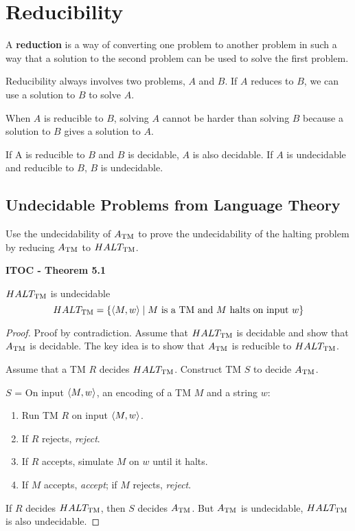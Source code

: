 \section{Reducibility}

A \textbf{reduction} is a way of converting one problem to another problem in such a way that a solution to the second problem can be used to solve the first problem.

Reducibility always involves two problems, $A$ and $B$. If $A$ reduces to $B$, we can use a solution to $B$ to solve $A$.

When $A$ is reducible to $B$, solving $A$ cannot be harder than solving $B$ because a solution to $B$ gives a solution to $A$.

{\color{blue} If A is reducible to $B$ and $B$ is decidable, $A$ is also decidable. If $A$ is undecidable and reducible to $B$, $B$ is undecidable.}

\subsection{Undecidable Problems from Language Theory}

Use the undecidability of $A_{\text{TM}}$ to prove the undecidability of the halting problem by reducing $A_{\text{TM}}$ to $HALT_{\text{TM}}$.


\label{lang:HALTTM_UDCDB}
\begin{shaded}
\textbf{ITOC - Theorem 5.1}

\medskip
$HALT_{\text{TM}}$ is undecidable
\[
HALT_{\text{TM}} = \{\langle{M, w}\rangle \mid \text{$M$ is a TM and $M$ halts on input $w$}\}
\]
\end{shaded}

\begin{mdframed}
\begin{proof}
Proof by contradiction. Assume that $HALT_{\text{TM}}$ is decidable and show that $A_{\text{TM}}$ is decidable. The key idea is to show that $A_{\text{TM}}$ is reducible to $HALT_{\text{TM}}$.

Assume that a TM $R$ decides $HALT_{\text{TM}}$. Construct TM $S$ to decide $A_{\text{TM}}$.

\medskip
$S$ = On input $\langle{M, w}\rangle$, an encoding of a TM $M$ and a string $w$:
\begin{enumerate}
\item Run TM $R$ on input $\langle{M, w}\rangle$.
\item If $R$ rejects, \textit{reject}.
\item If $R$ accepts, simulate $M$ on $w$ until it halts.
\item If $M$ accepts, \textit{accept}; if $M$ rejects, \textit{reject}.
\end{enumerate}

If $R$ decides $HALT_{\text{TM}}$, then $S$ decides $A_{\text{TM}}$. But $A_{\text{TM}}$ is undecidable, $HALT_{\text{TM}}$ is also undecidable.
\end{proof}
\end{mdframed}

